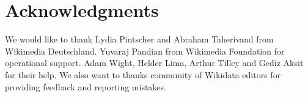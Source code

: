 \documentclass{sig-alternate}
\begin{document}
\section{Acknowledgments}
We would like to thank Lydia Pintscher and Abraham Taherivand from Wikimedia Deutschland. Yuvaraj Pandian from Wikimedia Foundation for operational support. Adam Wight, Helder Lima, Arthur Tilley and Gediz Aksit for their help. We also want to thanks community of Wikidata editors for providing feedback and reporting mistakes.


\end{document}
